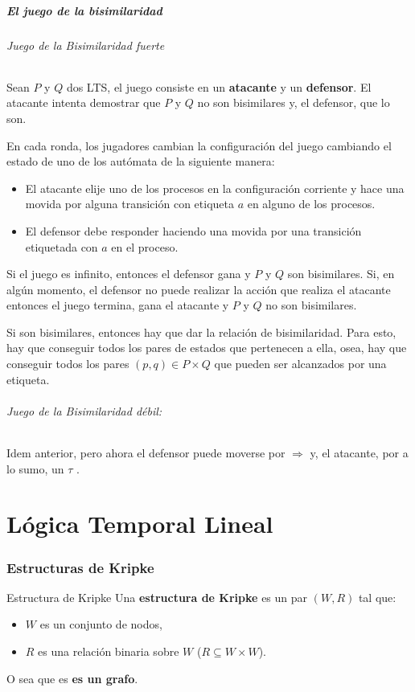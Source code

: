 \subsubsection{El juego de la bisimilaridad}
\paragraph{Juego de la Bisimilaridad fuerte}
Sean $P$ y $Q$ dos LTS, el juego consiste en un \textbf{atacante} y un \textbf{defensor}. El atacante intenta demostrar que $P$ y $Q$ no son bisimilares y, el defensor, que lo son.

En cada ronda, los jugadores cambian la configuración del juego cambiando el estado de uno de los autómata de la siguiente manera:
\begin{itemize}
    \item El atacante elije uno de los procesos en la configuración corriente y hace una movida por alguna transición con etiqueta $a$ en alguno de los procesos.
    \item El defensor debe responder haciendo una movida por una transición etiquetada con $a$ en el  proceso.
\end{itemize}

Si el juego es infinito, entonces el defensor gana y $P$ y $Q$ son bisimilares. Si, en algún momento, el defensor no puede realizar la acción que realiza el atacante entonces el juego termina, gana el atacante y $P$ y $Q$ no son bisimilares.

Si son bisimilares, entonces hay que dar la relación de bisimilaridad. Para esto, hay que conseguir todos los pares de estados que pertenecen a ella, osea, hay que conseguir todos los pares $(p,q)\in P\times Q$ que pueden ser alcanzados por una etiqueta.

\paragraph{Juego de la Bisimilaridad débil:} Idem anterior, pero ahora el defensor puede moverse por $\Rightarrow$ y, el atacante, por a lo sumo, un $\tau$ .

\newpage
\part{Lógica Temporal Lineal}
\section{Estructuras de Kripke}
\begin{definicion}{Estructura de Kripke}
Una \textbf{estructura de Kripke} es un par $(W,R)$ tal que:
\begin{itemize}
\item $W$ es un conjunto de nodos,
\item $R$ es una relación binaria sobre $W$ ($R\subseteq W\times W$).
\end{itemize}

O sea que es \textbf{es un grafo}. 
\end{definicion}

